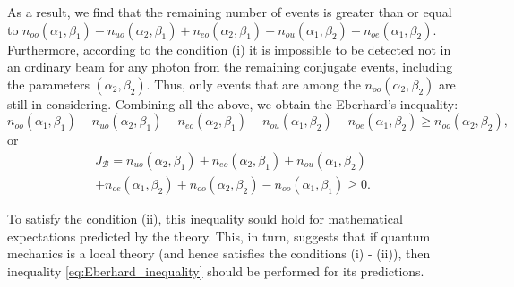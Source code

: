 \documentclass[11pt]{article}
\begin{document}
As a result, we find that the remaining number of events is greater than or equal to $ n_{oo} (\alpha_1, \beta_1) - n_{uo} (\alpha_2, \beta_1) + n_{eo} (\alpha_2, \beta_1) - n_{ou} (\alpha_1, \beta_2) - n_{oe} (\alpha_1, \beta_2) $. Furthermore, according to the condition (i) it is impossible to be detected not in an ordinary beam for any photon from the remaining conjugate events, including the parameters $ (\alpha_2, \beta_2) $. Thus, only events that are among the $n_{oo}(\alpha_2, \beta_2)$ are still in considering. Combining all the above, we obtain the Eberhard's inequality:
\[
n_{oo}(\alpha_1, \beta_1) - n_{uo}(\alpha_2, \beta_1) - n_{eo}(\alpha_2, \beta_1) - n_{ou}(\alpha_1, \beta_2) - n_{oe}(\alpha_1, \beta_2) \geq n_{oo}(\alpha_2, \beta_2),
\]
or
\begin{multline}
J_{\mathcal{B}} = n_{uo}(\alpha_2, \beta_1) + n_{eo}(\alpha_2, \beta_1) + n_{ou}(\alpha_1, \beta_2) \\
+ n_{oe}(\alpha_1, \beta_2) + n_{oo}(\alpha_2, \beta_2) - n_{oo}(\alpha_1, \beta_1) \geq 0.
\label{eq:Eberhard_inequality}
\end{multline}

To satisfy the condition (ii), this inequality sould hold for mathematical expectations predicted by the theory. This, in turn, suggests that if quantum mechanics is a local theory (and hence satisfies the conditions (i) - (ii)), then inequality \eqref{eq:Eberhard_inequality} should be performed for its predictions.
\end{document}
